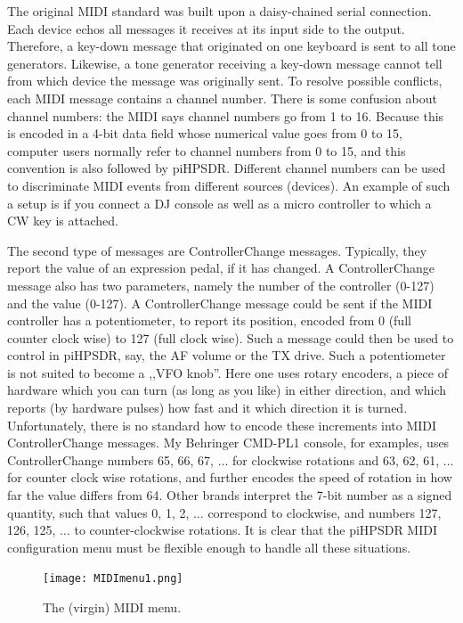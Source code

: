 \documentclass[12pt]{book}
\def\pH{pi\-HPSDR\xspace}
\begin{document}
The original MIDI standard was built upon a daisy-chained serial connection. Each device
echos all messages it receives at its input side to the output. Therefore, a key-down
message that originated on one keyboard is sent to all tone generators. Likewise, a tone
generator receiving a key-down message cannot tell from which device the message
was originally sent. To resolve possible conflicts, each MIDI message contains a channel
number. There is some confusion about channel numbers: the MIDI says channel numbers
go from 1 to 16. Because this is encoded in a 4-bit data field whose numerical value
goes from 0 to 15, computer users normally refer to channel numbers from 0 to 15,
and this convention is also followed by \pH. Different channel numbers can be used
to discriminate MIDI events from different sources (devices). An example of such a setup
is if you connect a DJ console as well as a micro controller to which a CW key is attached.

The second type of messages are ControllerChange messages. Typically, they report the value of
an expression pedal, if it has changed. A ControllerChange message also has two parameters,
namely the number of the controller (0-127) and the value (0-127). A ControllerChange
message could be sent if the MIDI controller has a potentiometer, to report its position,
encoded from 0 (full counter clock wise) to 127 (full clock wise). Such a message could then be
used to control in \pH, say, the AF volume or the TX drive. Such a potentiometer is
not suited to become a ,,VFO knob''. Here one uses rotary encoders, a piece of hardware which
you can turn (as long as you like) in either direction, and which reports (by hardware pulses)
how fast and it which direction it is turned. Unfortunately, there is no standard how to
encode these increments into MIDI ControllerChange messages. My Behringer CMD-PL1 console,
for examples, uses ControllerChange numbers 65, 66, 67, $\ldots$ for clockwise rotations
and 63, 62, 61, $\ldots$ for counter clock wise rotations, and further encodes the speed of
rotation in how far the value differs from 64. Other brands interpret the 7-bit number
as a signed quantity, such that values 0, 1, 2, $\ldots$ correspond to clockwise,
and numbers 127, 126, 125, $\ldots$ to counter-clockwise rotations. It is clear that
the \pH MIDI configuration menu must be flexible enough to handle all these situations.

\begin{figure}[ht]
\center
\texttt{[image: MIDImenu1.png]}
\caption{The (virgin) MIDI menu.}
\label{fig:MIDImenu1}
\end{figure}
\end{document}
